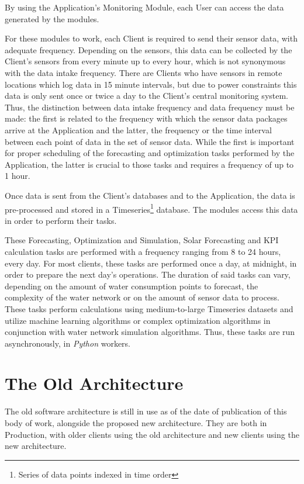 By using the Application's Monitoring Module, each User can access the data generated by the modules.

For these modules to work, each Client is required to send their sensor data, with adequate frequency. Depending on the sensors, this data can be collected by the Client's sensors from every minute up to every hour, which is not synonymous with the data intake frequency. There are Clients who have sensors in remote locations which log data in 15 minute intervals, but due to power constraints this data is only sent once or twice a day to the Client's central monitoring system. Thus, the distinction between data intake frequency and data frequency must be made: the first is related to the frequency with which the sensor data packages arrive at the Application and the latter, the frequency or the time interval between each point of data in the set of sensor data. While the first is important for proper scheduling of the forecasting and optimization tasks performed by the Application, the latter is crucial to those tasks and requires a frequency of up to 1 hour. 

Once data is sent from the Client's databases and to the Application, the data is pre-processed and stored in a Timeseries\footnote{Series of data points indexed in time order}\label{foot:timeseries} database. The modules access this data in order to perform their tasks. 

These Forecasting, Optimization and Simulation, Solar Forecasting and KPI calculation tasks are performed with a frequency ranging from 8 to 24 hours, every day. For most clients, these tasks are performed once a day, at midnight, in order to prepare the next day's operations. The duration of said tasks can vary, depending on the amount of water consumption points to forecast, the complexity of the water network or on the amount of sensor data to process. These tasks perform calculations using medium-to-large Timeseries datasets and utilize machine learning algorithms or complex optimization algorithms in conjunction with water network simulation algorithms. Thus, these tasks are run asynchronously, in \textit{Python} workers.



\section{The Old Architecture}\label{methodology:s:the-old-architecture}

The old software architecture is still in use as of the date of publication of this body of work, alongside the proposed new architecture. They are both in Production, with older clients using the old architecture and new clients using the new architecture.  

